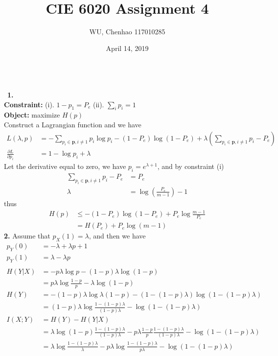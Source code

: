 \documentclass[12pt]{article}
\author{WU, Chenhao  117010285}
\title{CIE 6020 Assignment 4}
\date{April 14, 2019}
\begin{document}
	\maketitle
	~\\\
	\textbf{1.}\\
	\textbf{Constraint: } (i). $1-p_1 = P_e$ (ii). $\sum_i p_i = 1$\\
	\textbf{Object: } maximize $H(p)$ \\
	Construct a Lagrangian function and we have
	\begin{align*}
		L(\lambda, p) &= -\sum_{p_i\in\textbf{p}, i\not = 1} p_i\log p_i - (1-P_e)\log(1-P_e)+\lambda(\sum_{p_i\in\textbf{p},i\not=1}p_i-P_e) \\
		\frac{\partial L}{\partial p_i} &= 1 - \log p_i + \lambda
	\end{align*}
	Let the derivative equal to zero, we have $p_i = e^{\lambda+1}$, and by constraint (i)
	\begin{align*}
		\sum_{p_i\in\textbf{p},i\not=1}p_i-P_e &= P_e \\
		\lambda &= \log(\frac{P_e}{m-1}) - 1
	\end{align*} 
	thus
	\begin{align*}
		H(p) &\leq -(1-P_e)\log(1-P_e) + P_e\log\frac{m-1}{P_e} \\
			 &= H(P_e) + P_e\log(m-1)
	\end{align*}
	\textbf{2.} Assume that $p_X(1) = \lambda$, and then we have
		\begin{align*}
			p_Y(0) &= - \lambda + \lambda p + 1 \\
			p_Y(1) &= \lambda - \lambda p \\
			\\
			H(Y|X) &= -p\lambda\log p-(1-p)\lambda\log(1-p) \\
				   &= p\lambda\log\frac{1-p}{p} - \lambda\log(1-p) \\
			H(Y)   &= -(1-p)\lambda\log\lambda(1-p) - (1- (1-p)\lambda)\log(1-(1-p)\lambda) \\
				   &= (1-p)\lambda\log\frac{1-(1-p)\lambda}{(1-p)\lambda} - \log(1-(1-p)\lambda) \\
			I(X;Y) &= H(Y) - H(Y|X) \\
				   &= \lambda\log (1-p)\frac{1-(1-p)\lambda}{(1-p)\lambda} - p\lambda \frac{1-p}{p} \frac{1-(1-p)\lambda}{(1-p)\lambda}	- \log(1-(1-p)\lambda) \\
				   &= \lambda\log\frac{1-(1-p)\lambda}{\lambda} - p\lambda \log\frac{1-(1-p)\lambda}{p\lambda} - \log(1-(1-p)\lambda) 
		\end{align*}
\end{document}
